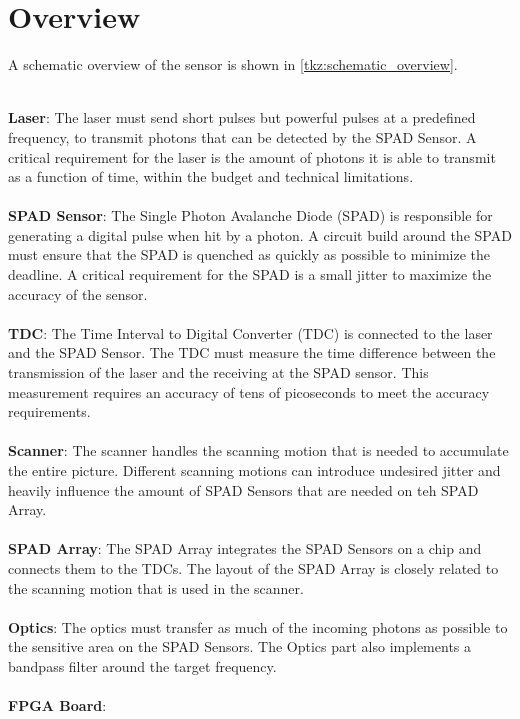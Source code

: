 \section{Overview} 
\label{ssec:overview}
A schematic overview of the sensor is shown in \cref{tkz:schematic_overview}.



~\\
\textbf{Laser}: The laser must send short pulses but powerful pulses at a predefined frequency, to transmit photons that can be detected by the SPAD Sensor. A critical requirement for the laser is the amount of photons it is able to transmit as a function of time, within the budget and technical limitations. \\
\\
\textbf{SPAD Sensor}: The Single Photon Avalanche Diode (SPAD) is responsible for generating a digital pulse when hit by a photon. A circuit build around the SPAD must ensure that the SPAD is quenched as quickly as possible to minimize the deadline. A critical requirement for the SPAD is a small jitter to maximize the accuracy of the sensor.  \\
\\
\textbf{TDC}: The Time Interval to Digital Converter (TDC) is connected to the laser and the SPAD Sensor. The TDC must measure the time difference between the transmission of the laser and the receiving at the SPAD sensor. This measurement requires an accuracy of tens of picoseconds to meet the accuracy requirements.\\
\\
\textbf{Scanner}: The scanner handles the scanning motion that is needed to accumulate the entire picture. Different scanning motions can introduce undesired jitter and heavily influence the amount of SPAD Sensors that are needed on teh SPAD Array. \\
\\
\textbf{SPAD Array}: The SPAD Array integrates the SPAD Sensors on a chip and connects them to the TDCs. The layout of the SPAD Array is closely related to the scanning motion that is used in the scanner.\\
\\
\textbf{Optics}:
The optics must transfer as much of the incoming photons as possible to the sensitive area on the SPAD Sensors. The Optics part also implements a bandpass filter around the target frequency. \\
\\
\textbf{FPGA Board}:
